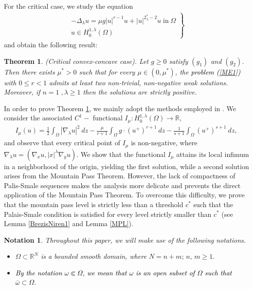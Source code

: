 \documentclass[12pt, notitlepage]{article}
\def\R{\mathbb{R}}
\newtheorem{theorem}{Theorem}[section]
\newtheorem{notn}{Notation}[section]
\begin{document}
{For the critical case, we study the equation
\begin{align}\label{ME1}
    \left. \begin{array}{l}
        -\Delta_\lambda u=\mu g|u|^{r-1}u+|u|^{2^*_\lambda-2}u \;\text{in}\; \Omega \\
         u\in H^{1,\lambda}_0(\Omega)
    \end{array}\right\} \tag{$E_\mu$}
\end{align}
 and obtain the following result:
\begin{theorem}\label{MT2}(Critical convex-concave case).
 Let $g\geq 0$ satisfy $(g_1)$ and $(g_2)$. Then there exists $\mu^*>0$ such that for every $\mu\in(0,\mu^*)$, the \textcolor{black}{problem (\ref{ME1})} with $0\leq r<1$ admits at least two non-trivial, non-negative weak solutions. Moreover, if $n=1\;,\lambda\geq 1$ then the solutions are strictly positive.     
\end{theorem}
 In order to prove Theorem \ref{MT2}, we mainly adopt the methods employed in \cite{FD, Silva}. We consider the associated $C^1-$ functional $I_\mu: H^{1,\lambda}_0(\Omega)\to\R$, 
 \begin{align}\label{CF}
     I_\mu(u)=\frac{1}{2}\int_\Omega |\nabla_\lambda u|^2\ dz-\frac{\mu}{r+1}\int_\Omega g\cdot (u^+)^{r+1}\ dz - \frac{1}{s+1}\int_\Omega (u^+)^{s+1}\ dz,
 \end{align}
and observe that every critical point of $I_\mu$ is non-negative, where $\nabla_\lambda u=(\nabla_x u, |x|^\lambda\nabla_y u)$. We show that the functional $I_\mu$ attains its local infimum in a neighborhood of the origin, yielding the first solution, while a second solution arises from the Mountain Pass Theorem. However, the lack of compactness of Palis-Smale sequences makes the analysis more delicate and prevents the direct application of the Mountain Pass Theorem. To overcome this difficulty, we prove that the mountain pass level is strictly less than a threshold $c^*$ such that the Palais-Smale condition is satisfied for every level strictly smaller than $c^*$ (see Lemma \ref{BrezisNiren1} and Lemma \ref{MPL}).



\begin{notn}
Throughout this paper, we will make use of the following notations.
\begin{itemize}
 \item $\Omega\subset\R^N$ is a bounded smooth domain, where $N=n+m;\, n, \, m\geq 1.$ 

 \item \textcolor{black}{By the notation $\omega\Subset\Omega$, we mean that $\omega$ is an open subset of $\Omega$ such that $\overline{\omega}\subset\Omega$.}


\end{itemize}
\end{notn}}
\end{document}
